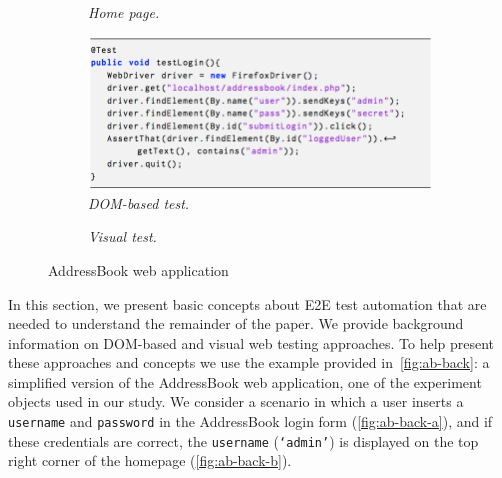 \begin{figure}[t]
\begin{subfigure}{.25\linewidth}
\caption{\emph{Home page.}}
\label{fig:ab-back-b} 
\end{subfigure}
\qquad
\begin{subfigure}{.25\linewidth}
\centering
\includegraphics[trim=0cm 0cm 2cm 0cm, clip=true, scale=0.22]{images/test.png}
\caption{\emph{DOM-based test.}}
\label{fig:ab-back-c} 
\end{subfigure}
\quad
\begin{subfigure}{.20\linewidth}
\centering
{}
\caption{\emph{Visual test.}}
\label{fig:ab-back-d} 
\end{subfigure}
\caption{AddressBook web application}
\label{fig:ab-back}
\end{figure}

In this section, we present basic concepts
about E2E test automation that are needed 
to understand the remainder of the paper.
We provide background information on 
DOM-based and visual web testing approaches.
To help present these approaches and concepts
we use the example provided in~\autoref{fig:ab-back}: 
a simplified version of the AddressBook web application, 
one of the experiment objects used in our study. 
We consider a scenario in which a user 
inserts a \texttt{username} and \texttt{password} 
in the AddressBook login form 
(\autoref{fig:ab-back-a}), 
and if these credentials are correct, 
the \texttt{username} (\texttt{`admin'}) is displayed on the top right corner of the homepage 
(\autoref{fig:ab-back-b}).

